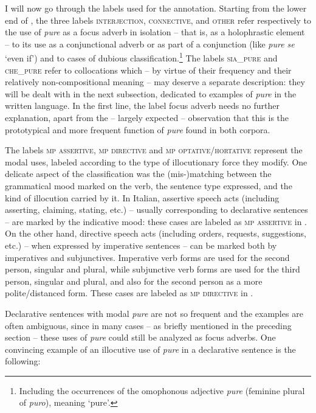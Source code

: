I will now go through the labels used for the annotation. Starting from the lower end of , the three labels \textsc{interjection}, \textsc{connective,} and \textsc{other} refer respectively to the use of \textit{pure} as a focus adverb in isolation – that is, as a holophrastic element – to its use as a conjunctional adverb or as part of a conjunction (like \textit{pure se} ‘even if’) and to cases of dubious classification.\footnote{Including the occurrences of the omophonous adjective \textit{pure} (feminine plural of \textit{puro}), meaning ‘pure’.} The labels \textsc{sia\_pure} and \textsc{che\_pure} refer to collocations which – by virtue of their frequency and their relatively non-compositional meaning – may deserve a separate description: they will be dealt with in the next subsection, dedicated to examples of \textit{pure} in the written language. In the first line, the label focus adverb needs no further explanation, apart from the – largely expected – observation that this is the prototypical and more frequent function of \textit{pure} found in both corpora.

The labels \textsc{mp} \textsc{assertive}, \textsc{mp} \textsc{directive} and \textsc{mp} \textsc{optative/hortative} represent the modal uses, labeled according to the type of illocutionary force they modify. One delicate aspect of the classification was the (mis-)matching between the grammatical mood marked on the verb, the sentence type expressed, and the kind of illocution carried by it. In Italian, assertive speech acts (including asserting, claiming, stating, etc.) – usually corresponding to declarative sentences – are marked by the indicative mood: these cases are labeled as \textsc{mp} \textsc{assertive} in . On the other hand, directive speech acts (including orders, requests, suggestions, etc.) – when expressed by imperative sentences – can be marked both by imperatives and subjunctives. Imperative verb forms are used for the second person, singular and plural, while subjunctive verb forms are used for the third person, singular and plural, and also for the second person as a more polite/distanced form. These cases are labeled as \textsc{mp} \textsc{directive} in .

Declarative sentences with modal \textit{pure} are not so frequent and the examples are often ambiguous, since in many cases – as briefly mentioned in the preceding section – these uses of \textit{pure} could still be analyzed as focus adverbs. One convincing example of an illocutive use of \textit{pure} in a declarative sentence is the following:


